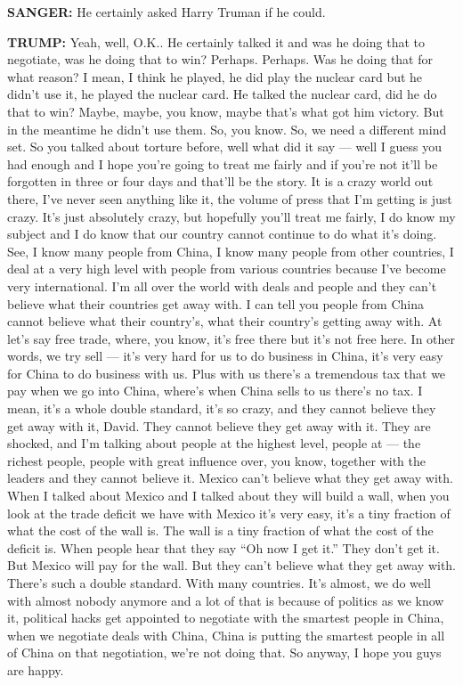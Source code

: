 \textbf{SANGER:} He certainly asked Harry Truman if he could.

\textbf{TRUMP:} Yeah, well, O.K.. He certainly talked it and was he
doing that to negotiate, was he doing that to win? Perhaps. Perhaps. Was
he doing that for what reason? I mean, I think he played, he did play
the nuclear card but he didn't use it, he played the nuclear card. He
talked the nuclear card, did he do that to win? Maybe, maybe, you know,
maybe that's what got him victory. But in the meantime he didn't use
them. So, you know. So, we need a different mind set. So you talked
about torture before, well what did it say --- well I guess you had
enough and I hope you're going to treat me fairly and if you're not
it'll be forgotten in three or four days and that'll be the story. It is
a crazy world out there, I've never seen anything like it, the volume of
press that I'm getting is just crazy. It's just absolutely crazy, but
hopefully you'll treat me fairly, I do know my subject and I do know
that our country cannot continue to do what it's doing. See, I know many
people from China, I know many people from other countries, I deal at a
very high level with people from various countries because I've become
very international. I'm all over the world with deals and people and
they can't believe what their countries get away with. I can tell you
people from China cannot believe what their country's, what their
country's getting away with. At let's say free trade, where, you know,
it's free there but it's not free here. In other words, we try sell ---
it's very hard for us to do business in China, it's very easy for China
to do business with us. Plus with us there's a tremendous tax that we
pay when we go into China, where's when China sells to us there's no
tax. I mean, it's a whole double standard, it's so crazy, and they
cannot believe they get away with it, David. They cannot believe they
get away with it. They are shocked, and I'm talking about people at the
highest level, people at --- the richest people, people with great
influence over, you know, together with the leaders and they cannot
believe it. Mexico can't believe what they get away with. When I talked
about Mexico and I talked about they will build a wall, when you look at
the trade deficit we have with Mexico it's very easy, it's a tiny
fraction of what the cost of the wall is. The wall is a tiny fraction of
what the cost of the deficit is. When people hear that they say ``Oh now
I get it.'' They don't get it. But Mexico will pay for the wall. But
they can't believe what they get away with. There's such a double
standard. With many countries. It's almost, we do well with almost
nobody anymore and a lot of that is because of politics as we know it,
political hacks get appointed to negotiate with the smartest people in
China, when we negotiate deals with China, China is putting the smartest
people in all of China on that negotiation, we're not doing that. So
anyway, I hope you guys are happy.

